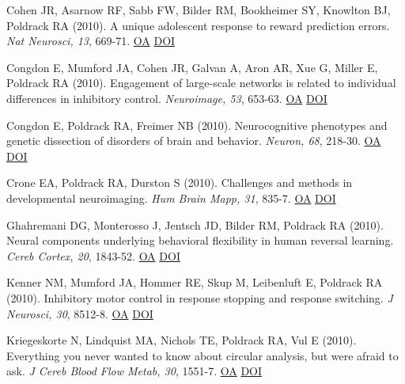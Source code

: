 \documentclass[10pt, letterpaper]{article}
\begin{document}
Cohen JR, Asarnow RF, Sabb FW, Bilder RM, Bookheimer SY, Knowlton BJ, Poldrack RA (2010). A unique adolescent response to reward prediction errors. \textit{Nat Neurosci, 13}, 669-71. \href{https://www.ncbi.nlm.nih.gov/pmc/articles/PMC2876211}{OA} \href{http://dx.doi.org/10.1038/nn.2558}{DOI} \vspace{2mm}

Congdon E, Mumford JA, Cohen JR, Galvan A, Aron AR, Xue G, Miller E, Poldrack RA (2010). Engagement of large-scale networks is related to individual differences in inhibitory control. \textit{Neuroimage, 53}, 653-63. \href{https://www.ncbi.nlm.nih.gov/pmc/articles/PMC2930099}{OA} \href{http://dx.doi.org/10.1016/j.neuroimage.2010.06.062}{DOI} \vspace{2mm}

Congdon E, Poldrack RA, Freimer NB (2010). Neurocognitive phenotypes and genetic dissection of disorders of brain and behavior. \textit{Neuron, 68}, 218-30. \href{https://www.ncbi.nlm.nih.gov/pmc/articles/PMC4123421}{OA} \href{http://dx.doi.org/10.1016/j.neuron.2010.10.007}{DOI} \vspace{2mm}

Crone EA, Poldrack RA, Durston S (2010). Challenges and methods in developmental neuroimaging. \textit{Hum Brain Mapp, 31}, 835-7. \href{https://www.ncbi.nlm.nih.gov/pmc/articles/PMC6870689}{OA} \href{http://dx.doi.org/10.1002/hbm.21053}{DOI} \vspace{2mm}

Ghahremani DG, Monterosso J, Jentsch JD, Bilder RM, Poldrack RA (2010). Neural components underlying behavioral flexibility in human reversal learning. \textit{Cereb Cortex, 20}, 1843-52. \href{https://www.ncbi.nlm.nih.gov/pmc/articles/PMC2901019}{OA} \href{http://dx.doi.org/10.1093/cercor/bhp247}{DOI} \vspace{2mm}

Kenner NM, Mumford JA, Hommer RE, Skup M, Leibenluft E, Poldrack RA (2010). Inhibitory motor control in response stopping and response switching. \textit{J Neurosci, 30}, 8512-8. \href{https://www.ncbi.nlm.nih.gov/pmc/articles/PMC2905623}{OA} \href{http://dx.doi.org/10.1523/jneurosci.1096-10.2010}{DOI} \vspace{2mm}

Kriegeskorte N, Lindquist MA, Nichols TE, Poldrack RA, Vul E (2010). Everything you never wanted to know about circular analysis, but were afraid to ask. \textit{J Cereb Blood Flow Metab, 30}, 1551-7. \href{https://www.ncbi.nlm.nih.gov/pmc/articles/PMC2949251}{OA} \href{http://dx.doi.org/10.1038/jcbfm.2010.86}{DOI} \vspace{2mm}
\end{document}

